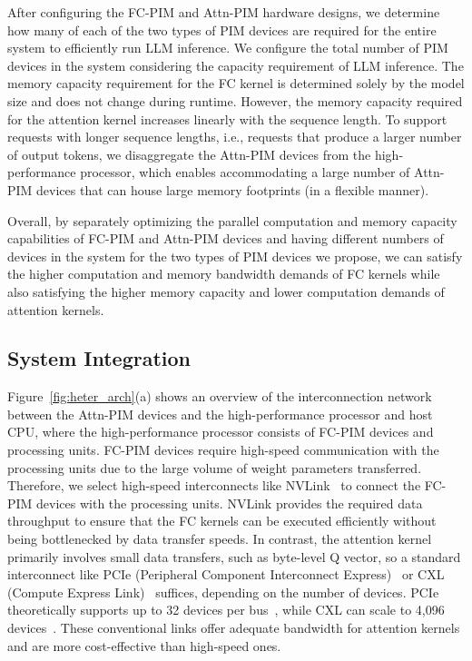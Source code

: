 After configuring the FC-PIM and Attn-PIM hardware designs, we determine how many of each of the two types of PIM devices are required for the entire system to efficiently run LLM inference. We configure the total number of PIM devices in the system considering the capacity requirement of LLM inference.
The memory capacity requirement for the FC kernel is determined solely by the model size and does not change during runtime.
However, the memory capacity required for the attention kernel increases linearly with the sequence length.
To support requests with longer sequence lengths, i.e., requests that produce a larger number of output tokens, we disaggregate the Attn-PIM devices from the high-performance processor, which enables accommodating a large number of Attn-PIM devices that can house large memory footprints (in a flexible manner).


Overall, by separately optimizing the parallel computation and memory capacity capabilities of FC-PIM and Attn-PIM devices and having different numbers of devices in the system for the two types of PIM devices we propose, we can satisfy the higher computation and memory bandwidth demands of FC kernels while also satisfying the higher memory capacity and lower computation demands of attention kernels. 



\subsection{System Integration} %
Figure~\ref{fig:heter_arch}(a) shows an overview of the interconnection network between the Attn-PIM devices and the high-performance processor and host CPU, where the high-performance processor consists of FC-PIM devices and processing units. FC-PIM devices require high-speed communication with the processing units due to the large volume of weight parameters transferred.
Therefore, we select high-speed interconnects like NVLink~\cite{NVlink} to connect the FC-PIM devices with the processing units. NVLink provides the required data throughput to ensure that the FC kernels can be executed efficiently without being bottlenecked by data transfer speeds.
In contrast, the attention kernel primarily involves small data transfers, such as byte-level Q vector, so a standard interconnect like PCIe (Peripheral Component Interconnect Express)~\cite{mayhew2003pci} or CXL (Compute Express Link)~\cite{das2024introduction} suffices, depending on the number of devices. PCIe theoretically supports up to 32 devices per bus~\cite{miller2009motivating}, while CXL can scale to 4,096 devices~\cite{das2024introduction}. These conventional links offer adequate bandwidth for attention kernels and are more cost-effective than high-speed ones.





